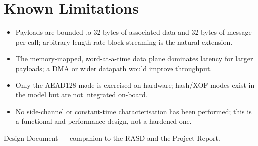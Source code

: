 \documentclass[11pt,a4paper]{article}
\begin{document}
\section{Known Limitations}
\begin{itemize}
\item Payloads are bounded to 32 bytes of associated data and 32 bytes of message
      per call; arbitrary-length rate-block streaming is the natural extension.
\item The memory-mapped, word-at-a-time data plane dominates latency for larger
      payloads; a DMA or wider datapath would improve throughput.
\item Only the AEAD128 mode is exercised on hardware; hash/XOF modes exist in the
      model but are not integrated on-board.
\item No side-channel or constant-time characterisation has been performed; this
      is a functional and performance design, not a hardened one.
\end{itemize}

\vfill
\begin{center}\small\color{gray}
Design Document --- companion to the RASD and the Project Report.
\end{center}
\end{document}
